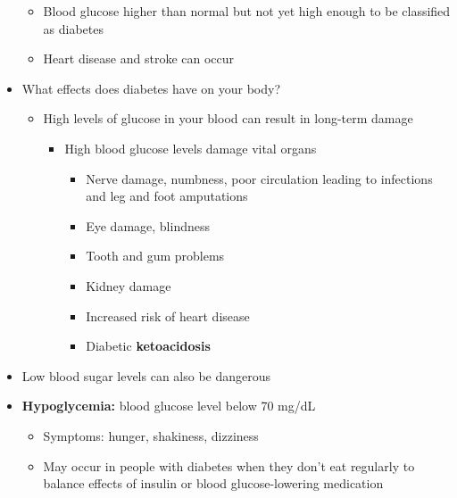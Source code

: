 \documentclass[12pt]{article}
\begin{document}
\begin{itemize}
\begin{itemize}
                        \item Blood glucose higher than normal but not yet high enough to be classified as diabetes
                        \item Heart disease and stroke can occur
                    \end{itemize}
                \item What effects does diabetes have on your body?
                    \begin{itemize}
                        \item High levels of glucose in your blood can result in long-term damage
                            \begin{itemize}
                                \item High blood glucose levels damage vital organs
                                    \begin{itemize}
                                        \item Nerve damage, numbness, poor circulation leading to infections and leg and foot amputations
                                        \item Eye damage, blindness
                                        \item Tooth and gum problems
                                        \item Kidney damage
                                        \item Increased risk of heart disease
                                        \item Diabetic \textbf{ketoacidosis}
                                    \end{itemize}
                            \end{itemize}
                    \end{itemize}
                \item Low blood sugar levels can also be dangerous
                \item \textbf{Hypoglycemia:} blood glucose level below 70 mg/dL
                    \begin{itemize}
                        \item Symptoms: hunger, shakiness, dizziness
                        \item May occur in people with diabetes when they don't eat regularly to balance effects of insulin or blood glucose-lowering medication
                            \begin{itemize}

\end{itemize}
\end{itemize}
\end{itemize}
\end{document}
